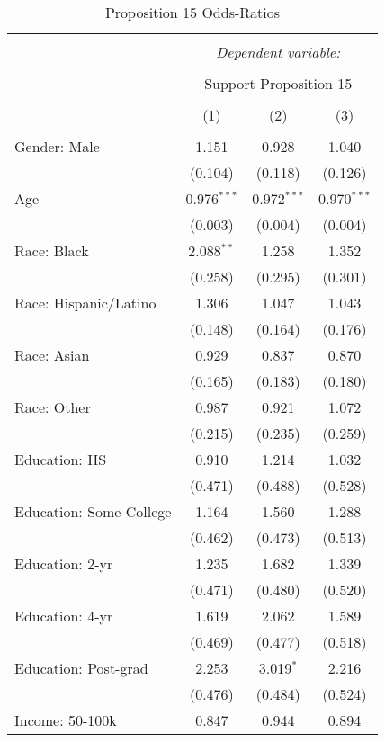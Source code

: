 
\begin{table}[!htbp] \centering 
  \caption{Proposition 15 Odds-Ratios} 
  \label{} 
\footnotesize 
\begin{tabular}{@{\extracolsep{5pt}}lccc} 
\\[-1.8ex]\hline 
\hline \\[-1.8ex] 
 & \multicolumn{3}{c}{\textit{Dependent variable:}} \\ 
\cline{2-4} 
\\[-1.8ex] & \multicolumn{3}{c}{Support Proposition 15} \\ 
\\[-1.8ex] & (1) & (2) & (3)\\ 
\hline \\[-1.8ex] 
 Gender: Male & 1.151 & 0.928 & 1.040 \\ 
  & (0.104) & (0.118) & (0.126) \\ 
  Age & 0.976$^{***}$ & 0.972$^{***}$ & 0.970$^{***}$ \\ 
  & (0.003) & (0.004) & (0.004) \\ 
  Race: Black & 2.088$^{**}$ & 1.258 & 1.352 \\ 
  & (0.258) & (0.295) & (0.301) \\ 
  Race: Hispanic/Latino & 1.306 & 1.047 & 1.043 \\ 
  & (0.148) & (0.164) & (0.176) \\ 
  Race: Asian & 0.929 & 0.837 & 0.870 \\ 
  & (0.165) & (0.183) & (0.180) \\ 
  Race: Other & 0.987 & 0.921 & 1.072 \\ 
  & (0.215) & (0.235) & (0.259) \\ 
  Education: HS & 0.910 & 1.214 & 1.032 \\ 
  & (0.471) & (0.488) & (0.528) \\ 
  Education: Some College & 1.164 & 1.560 & 1.288 \\ 
  & (0.462) & (0.473) & (0.513) \\ 
  Education: 2-yr & 1.235 & 1.682 & 1.339 \\ 
  & (0.471) & (0.480) & (0.520) \\ 
  Education: 4-yr & 1.619 & 2.062 & 1.589 \\ 
  & (0.469) & (0.477) & (0.518) \\ 
  Education: Post-grad & 2.253 & 3.019$^{*}$ & 2.216 \\ 
  & (0.476) & (0.484) & (0.524) \\ 
  Income: 50-100k & 0.847 & 0.944 & 0.894 \\ 

\end{tabular}
\end{table}
